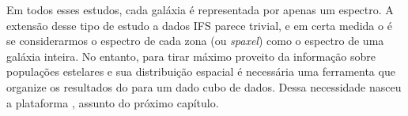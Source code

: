 Em todos esses estudos, cada galáxia é representada por apenas um espectro. A
extensão desse tipo de estudo a dados IFS parece trivial, e em certa medida o é
se considerarmos o espectro de cada zona (ou {\em spaxel}) como o espectro de
uma galáxia inteira. No entanto, para tirar máximo proveito da informação sobre
populações estelares e sua distribuição espacial é necessária uma ferramenta que
organize os resultados do \starlight para um dado cubo de dados. Dessa
necessidade nasceu a plataforma \pycasso, assunto do próximo capítulo.

%


